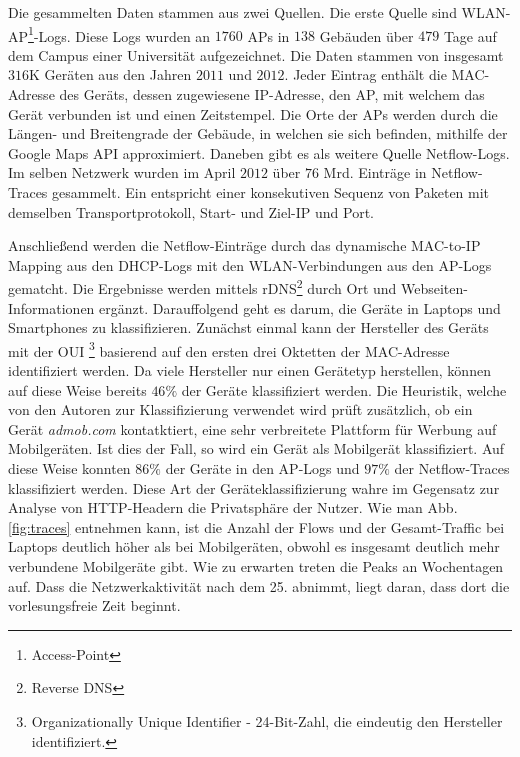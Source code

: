 \documentclass[12pt, a4paper]{article}
\begin{document}
Die gesammelten Daten stammen aus zwei Quellen. Die erste Quelle sind WLAN-AP\footnote{Access-Point}-Logs. 
Diese Logs wurden an $1760$ APs in $138$ Gebäuden über $479$ Tage auf dem
Campus einer Universität aufgezeichnet. Die Daten stammen von insgesamt $316$\textsc{K} Geräten aus den Jahren $2011$ und $2012$.
Jeder Eintrag enthält die MAC-Adresse des Geräts, dessen zugewiesene IP-Adresse, den AP, mit welchem das Gerät verbunden ist
und einen Zeitstempel.
Die Orte der APs werden durch die Längen- und Breitengrade der Gebäude, in welchen sie sich befinden, mithilfe der Google Maps API
approximiert. Daneben gibt es als weitere Quelle Netflow-Logs. Im selben Netzwerk wurden im April $2012$ über $76$ Mrd.
Einträge in Netflow-Traces gesammelt. Ein  entspricht einer konsekutiven Sequenz von Paketen mit demselben
Transportprotokoll, Start- und Ziel-IP und Port. \cite{Alipour2018}

\vfill
\pagebreak

Anschließend werden die Netflow-Einträge durch das dynamische MAC-to-IP Mapping aus den DHCP-Logs mit den WLAN-Verbindungen
aus den AP-Logs gematcht. Die Ergebnisse werden mittels rDNS\footnote{Reverse DNS} durch Ort und Webseiten-Informationen
ergänzt. \cite{Alipour2018}
\newline\newline
Darauffolgend geht es darum, die Geräte in Laptops und Smartphones zu klassifizieren.
Zunächst einmal kann der Hersteller des Geräts mit der OUI \footnote{Organizationally Unique Identifier - 24-Bit-Zahl, 
die eindeutig den Hersteller identifiziert.} basierend auf den ersten drei Oktetten der MAC-Adresse identifiziert werden.
Da viele Hersteller nur einen Gerätetyp herstellen, können auf diese Weise bereits
$46 \%$ der Geräte klassifiziert werden. Die Heuristik, welche von den Autoren zur Klassifizierung verwendet wird
prüft zusätzlich, ob ein Gerät \textit{admob.com} kontatktiert, eine sehr verbreitete Plattform für Werbung auf Mobilgeräten.
Ist dies der Fall, so wird ein Gerät als Mobilgerät klassifiziert. Auf diese Weise konnten $86 \%$ der Geräte in den AP-Logs
und $97 \%$ der Netflow-Traces klassifiziert werden. Diese Art der Geräteklassifizierung wahre im Gegensatz zur Analyse von 
HTTP-Headern die Privatsphäre der Nutzer.\newline
Wie man Abb. \ref{fig:traces} entnehmen kann, ist die Anzahl der Flows und der
Gesamt-Traffic bei Laptops deutlich höher als bei Mobilgeräten, obwohl es insgesamt deutlich mehr verbundene Mobilgeräte gibt.
Wie zu erwarten treten die Peaks an Wochentagen auf. Dass die Netzwerkaktivität nach dem 25. abnimmt, liegt daran, dass dort
die vorlesungsfreie Zeit beginnt.
\end{document}
